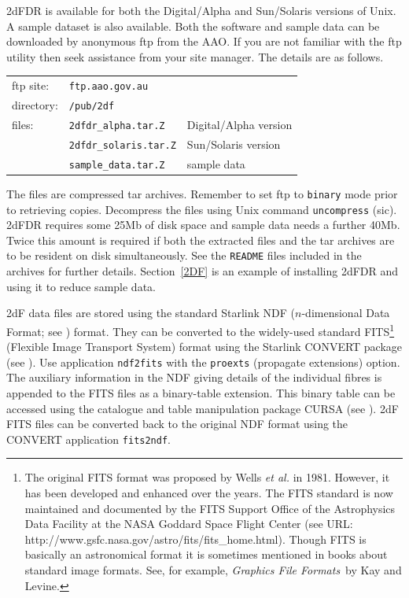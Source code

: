 \documentclass[chapters,twoside,11pt]{starlink}
\begin{document}
2dFDR is available for both the Digital/Alpha and Sun/Solaris versions
of Unix.  A sample dataset is also available.  Both the software and
sample data can be downloaded by anonymous ftp from the AAO.  If you are
not familiar with the ftp utility then seek assistance from your site
manager.  The details are as follows.

\begin{tabular}{lll}
ftp site:  & \texttt{ftp.aao.gov.au}       & \\
directory: & \texttt{/pub/2df}             & \\
files:     & \texttt{2dfdr\_alpha.tar.Z}   & Digital/Alpha version \\
           & \texttt{2dfdr\_solaris.tar.Z} & Sun/Solaris version   \\
           & \texttt{sample\_data.tar.Z}   & sample data           \\
\end{tabular}

The files are compressed tar archives.  Remember to set ftp to \texttt{binary}
mode prior to retrieving copies.  Decompress the files using Unix command
\texttt{uncompress} (sic).  2dFDR requires some 25Mb of disk space and
sample data needs a further 40Mb.  Twice this amount is required if
both the extracted files and the tar archives are to be resident on
disk simultaneously.  See the \texttt{README} files included in the archives
for further details.  Section~\ref{2DF} is an example of installing 2dFDR
and using it to reduce sample data.

2dF data files are stored using the standard Starlink NDF ($n$-dimensional
Data Format; see \cite{SUN33}) format.  They
can be converted to the widely-used standard FITS\footnote{The
original FITS format was proposed by Wells \textit{et al.}\/\cite{WELLS81}
in 1981.  However, it has been developed and enhanced over the years.
The FITS standard is now maintained and documented by the FITS Support
Office of the Astrophysics Data Facility at the NASA Goddard Space
Flight Center (see URL: 
{http://www.gsfc.nasa.gov/astro/fits/fits\_home.html}).
Though FITS is basically an astronomical format it is sometimes
mentioned in books about standard image formats.  See, for example,
\textit{Graphics File Formats}\, by Kay and Levine\cite{KAY95}.}
(Flexible Image Transport System) format using the Starlink CONVERT
package (see \cite{SUN55}).  Use application \texttt{ndf2fits} with the \texttt{proexts} (propagate extensions) option.  The
auxiliary information in the NDF giving details of the individual
fibres is appended to the FITS files as a binary-table extension.  This
binary table can be accessed using the catalogue and table manipulation
package CURSA (see \cite{SUN190}).  2dF FITS files
can be converted back to the original NDF format using the CONVERT
application \texttt{fits2ndf}.
\end{document}
